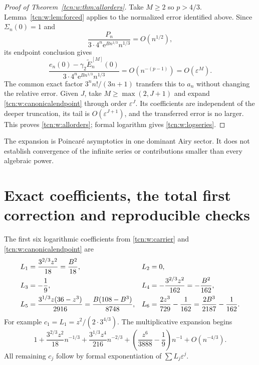 \documentclass[11pt,letterpaper]{article}
\newcommand{\eps}{\varepsilon}
\newcommand{\ee}{\mathrm e}
\theoremstyle{remark}
\begin{document}
\begin{proof}[Proof of Theorem~\ref{tcn:w:thm:allorders}]
Take $M\ge2$ so $p>4/3$. Lemma~\ref{tcn:w:lem:forced} applies to the normalized error identified above. Since $\Sigma_n(0)=1$ and
\[
 \frac{P_n}{3\cdot4^n\ee^{Bn^{1/3}}n^{1/3}}=O(n^{1/2}),
\]
its endpoint conclusion gives
\[
 \frac{e_n(0)-\gamma_2\widetilde E_n^{[M]}(0)}
 {3\cdot4^n\ee^{Bn^{1/3}}n^{1/3}}=O(n^{-(p-1)})=O(\eps^M).
\]
The common exact factor $3^nn!/(3n+1)$ transfers this to $a_n$ without changing the relative error. Given $J$, take $M\ge\max(2,J+1)$ and expand \eqref{tcn:w:canonicalendpoint} through order $\eps^J$. Its coefficients are independent of the deeper truncation, its tail is $O(\eps^{J+1})$, and the transferred error is no larger. This proves \eqref{tcn:w:allorders}; formal logarithm gives \eqref{tcn:w:logseries}.
\end{proof}
The expansion is Poincar\'e asymptotics in one dominant Airy sector. It does not establish convergence of the infinite series or contributions smaller than every algebraic power.

\section{Exact coefficients, the total first correction and reproducible checks}\label{tcn:w:sec:coefficients}
The first six logarithmic coefficients from \eqref{tcn:w:carrier} and \eqref{tcn:w:canonicalendpoint} are
\begin{align}
 L_1&=\frac{3^{2/3}z^2}{18}=\frac{B^2}{18},&L_2&=0,\notag\\
 L_3&=-\frac19,&L_4&=-\frac{3^{2/3}z^2}{162}=-\frac{B^2}{162},\label{tcn:w:logcoeffs}\\
 L_5&=\frac{3^{1/3}z(36-z^3)}{2916}=\frac{B(108-B^3)}{8748},&
 L_6&=\frac{2z^3}{729}-\frac1{162}=\frac{2B^3}{2187}-\frac1{162}.\notag
\end{align}
For example $c_1=L_1=z^2/(2\cdot3^{4/3})$. The multiplicative expansion begins
\begin{equation}\label{tcn:w:firstcoeffs}
 1+\frac{3^{2/3}z^2}{18}n^{-1/3}
 +\frac{3^{1/3}z^4}{216}n^{-2/3}
 +\left(\frac{z^6}{3888}-\frac19\right)n^{-1}+O(n^{-4/3}).
\end{equation}
All remaining $c_j$ follow by formal exponentiation of $\sum L_j\eps^j$.
\end{document}
